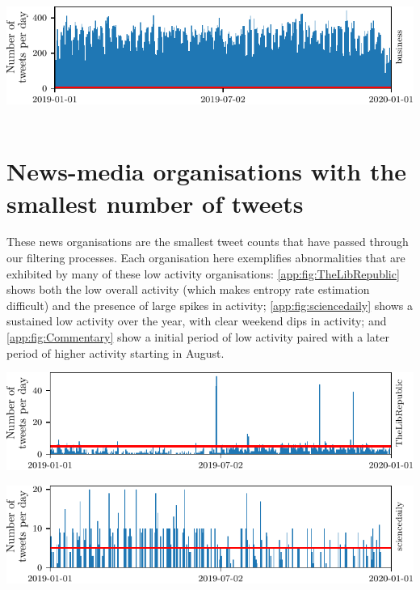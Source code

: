 \begin{center}

\includegraphics{appendix2/figs/tweet_times/business.pdf}~
\end{center}



\section{News-media organisations with the smallest number of tweets}

These news organisations are the smallest tweet counts that have passed through our filtering processes. Each organisation here exemplifies abnormalities that are exhibited by many of these low activity organisations: \autoref{app:fig:TheLibRepublic} shows both the low overall activity (which makes entropy rate estimation difficult) and the presence of large spikes in activity; \autoref{app:fig:sciencedaily} shows a sustained low activity over the year, with clear weekend dips in activity; and \autoref{app:fig:Commentary} show a initial period of low activity paired with a later period of higher activity starting in August.

\begin{center}

\includegraphics{appendix2/figs/tweet_times/TheLibRepublic.pdf}
\label{app:fig:TheLibRepublic}
\end{center}

\begin{center}

\includegraphics{appendix2/figs/tweet_times/sciencedaily.pdf}
\label{app:fig:sciencedaily}
\end{center}{}

